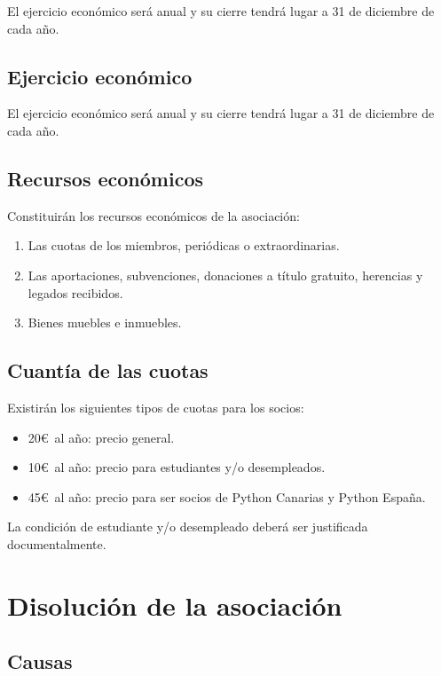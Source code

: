 \documentclass[a4paper, 12pt, oneside]{book}
\begin{document}
El ejercicio económico será anual y su cierre tendrá lugar a 31 de diciembre de cada año.

\section{Ejercicio económico}

El ejercicio económico será anual y su cierre tendrá lugar a 31 de diciembre de cada año.

\section{Recursos económicos}

Constituirán los recursos económicos de la asociación:

\begin{enumerate}
    \item Las cuotas de los miembros, periódicas o extraordinarias.  
    \item Las aportaciones, subvenciones, donaciones a título gratuito, herencias y legados recibidos.  
    \item Bienes muebles e inmuebles.
\end{enumerate}

\section{Cuantía de las cuotas}

Existirán los siguientes tipos de cuotas para los socios:

\begin{itemize}
    \item 20\euro\ al año: precio general.
    \item 10\euro\ al año: precio para estudiantes y/o desempleados.
    \item 45\euro\ al año: precio para ser socios de Python Canarias y Python España.
\end{itemize}

La condición de estudiante y/o desempleado deberá ser justificada documentalmente.

\chapter{Disolución de la asociación}

\section{Causas}
\end{document}
